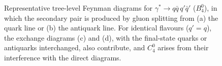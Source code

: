 \begin{figure}[h!]
\caption{Representative tree-level Feynman diagrams for $\gamma^*\to q\bar q\,q'\bar q'$ ($B_4^0$), in which the secondary pair is produced by gluon splitting from (a) the quark line or (b) the antiquark line. For identical flavours ($q'=q$), the exchange diagrams (c) and (d), with the final-state quarks or antiquarks interchanged, also contribute, and $C_4^0$ arises from their interference with the direct diagrams.}
\label{fig:diagBC40}
\end{figure}
